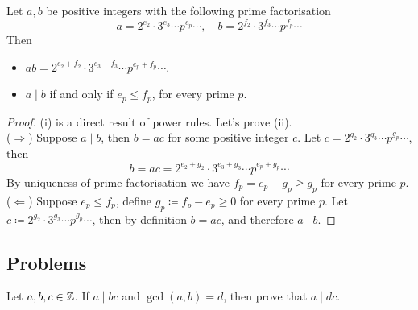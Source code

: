 \vspace*{1em}


\begin{proposition}\label{primeprod}
Let $a,b$ be positive integers with the following prime factorisation
\[a = 2^{e_2}\cdot 3^{e_3}\cdots p^{e_p}\cdots,\quad b = 2^{f_2}\cdot 3^{f_3}\cdots p^{f_p}\cdots\]
Then
\begin{itemize}
\item[(i)] $ab = 2^{e_2 + f_2}\cdot 3^{e_3 + f_3}\cdots p^{e_p + f_p}\cdots$.
\item[(ii)] $a\mid b$ if and only if $e_p \leq f_p$, for every prime $p$.
\end{itemize}
\end{proposition}
\begin{proof} 
(i) is a direct result of power rules. Let's prove (ii).\\[0.5em]
($\Rightarrow$) Suppose $a\mid b$, then $b = ac$ for some positive integer $c$. Let $c = 2^{g_2}\cdot 3^{g_3}\cdots p^{g_p}\cdots$, then
\[b = ac = 2^{e_2+g_2}\cdot 3^{e_3+g_3}\cdots p^{e_p+g_p}\cdots\]
By uniqueness of prime factorisation we have $f_p = e_p + g_p \geq g_p$ for every prime $p$.\\[0.5em]
($\Leftarrow$) Suppose $e_p \leq f_p$, define $g_p \coloneqq f_p - e_p \geq 0$ for every prime $p$. Let $c\coloneqq 2^{g_2}\cdot 3^{g_3}\cdots p^{g_p}\cdots$, then by definition $b = ac$, and therefore $a\mid b$.
\end{proof}


\vspace*{0.2in}

\subsection{Problems}
\vspace{0.1in}

\begin{problem}\label{problem 2.1}
Let $a,b,c \in \mathbb Z$. If $a\mid bc$ and $\gcd(a,b) = d$, then prove that $a\mid dc$.
\end{problem}

\vspace*{0.1in}

